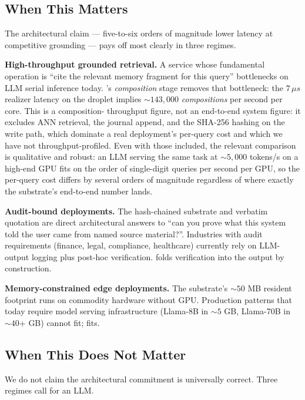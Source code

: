 \subsection{When This Matters}
\label{sec:when-matters}

The architectural claim --- five-to-six orders of magnitude
lower latency at competitive grounding --- pays off most clearly
in three
regimes.

\textbf{High-throughput grounded retrieval.} A service whose
fundamental operation is ``cite the relevant memory fragment for
this query'' bottlenecks on LLM serial inference today. \hyphae{}'s
\emph{composition} stage removes that bottleneck: the $7\,\mu s$
realizer latency on the droplet implies $\sim 143{,}000$
\emph{compositions} per second per core. This is a composition-
throughput figure, not an end-to-end system figure: it excludes
ANN retrieval, the journal append, and the SHA-256 hashing on the
write path, which dominate a real deployment's per-query cost and
which we have not throughput-profiled. Even with those included,
the relevant comparison is qualitative and robust: an LLM serving
the same task at $\sim 5{,}000$ tokens/s on a high-end GPU fits on
the order of single-digit queries per second per GPU, so the
per-query cost differs by several orders of magnitude regardless
of where exactly the substrate's end-to-end number lands.

\textbf{Audit-bound deployments.} The hash-chained substrate and
verbatim quotation are direct architectural answers to ``can you
prove what this system told the user came from named source
material?''. Industries with audit requirements (finance, legal,
compliance, healthcare) currently rely on LLM-output logging plus
post-hoc verification. \hyphae{} folds verification into the
output by construction.

\textbf{Memory-constrained edge deployments.} The substrate's
$\sim 50$ MB resident footprint runs on commodity hardware
without GPU. Production patterns that today require model
serving infrastructure (Llama-8B in $\sim 5$ GB, Llama-70B in
$\sim 40$+ GB) cannot fit; \hyphae{} fits.

\subsection{When This Does Not Matter}
\label{sec:when-doesnt}

We do not claim the architectural commitment is universally
correct. Three regimes call for an LLM.

